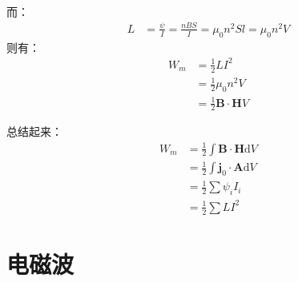 \documentclass[12pt,onecolumn,a4paper]{book}
\numberwithin{table}{subsection}
\numberwithin{equation}{subsection}
\begin{document}
    而：
    \begin{align}
        L & = \frac{\psi}{I} = \frac{nBS}{I} = \mu_0 n^2 S l = \mu_0 n^2 V
    \end{align}
    则有：
    \begin{align}
        W_m & = \frac{1}{2} LI^2                            \\
            & = \frac{1}{2}\mu_0 n^2 V                      \\
            & = \frac{1}{2}  \mathbf{B} \cdot \mathbf{H}  V
    \end{align}

    总结起来：
    \begin{align}
        W_m & = \frac{1}{2} \int \mathbf{B} \cdot \mathbf{H} \mathrm{d} V  \\
            & =  \frac{1}{2} \int\mathbf{j}_0 \cdot\mathbf{A} \mathrm{d} V \\
            & = \frac{1}{2} \sum \psi_i I_i                                \\
            & = \frac{1}{2} \sum L I^2
    \end{align}

    \chapter{电磁波}
\end{document}
